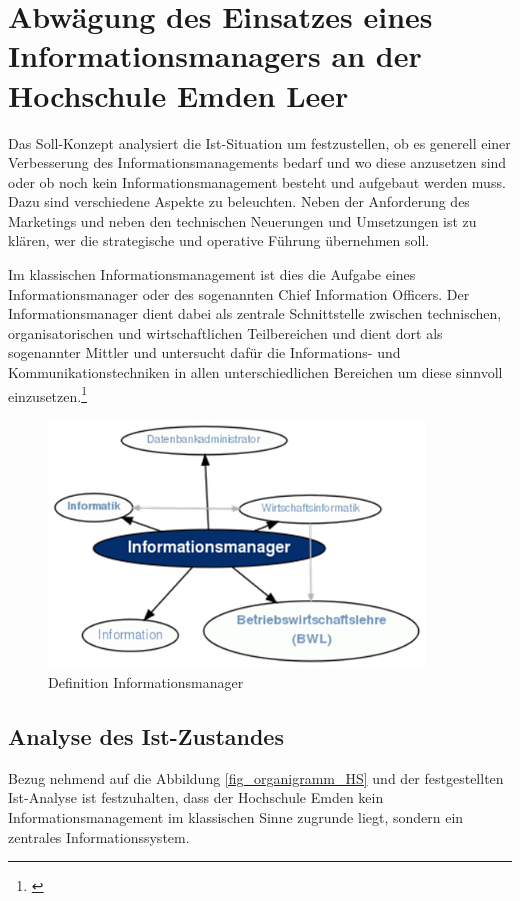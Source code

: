 \section{Abwägung des Einsatzes eines Informationsmanagers an der Hochschule Emden Leer}
Das Soll-Konzept analysiert die Ist-Situation um festzustellen, ob es generell einer Verbesserung des Informationsmanagements bedarf und wo diese anzusetzen sind oder ob noch kein Informationsmanagement besteht und aufgebaut werden muss. Dazu sind verschiedene Aspekte zu beleuchten. Neben der Anforderung des Marketings und neben den  technischen Neuerungen und Umsetzungen ist zu klären, wer die strategische und operative Führung übernehmen soll. 

Im klassischen Informationsmanagement ist dies die Aufgabe eines Informationsmanager oder des sogenannten Chief Information Officers. Der Informationsmanager dient dabei als zentrale Schnittstelle zwischen technischen, organisatorischen und wirtschaftlichen Teilbereichen und dient dort als sogenannter Mittler und untersucht dafür die Informations- und Kommunikationstechniken in allen unterschiedlichen Bereichen um diese sinnvoll einzusetzen.\footnote{\cite[86]{krcmar_einfuhrung_2015}}

\begin{figure}[h!]
	\centering
	\includegraphics[width=10cm]{kapitel/gruppe3/bilder/definition_informationsmanager}
	\caption{Definition Informationsmanager}
	\label{fig_definition_informationsmanager}
\end{figure}

\subsection{Analyse des Ist-Zustandes}
Bezug nehmend auf die Abbildung \ref{fig_organigramm_HS} und der festgestellten Ist-Analyse ist festzuhalten, dass der Hochschule Emden kein Informationsmanagement im klassischen Sinne zugrunde liegt, sondern ein zentrales Informationssystem.

